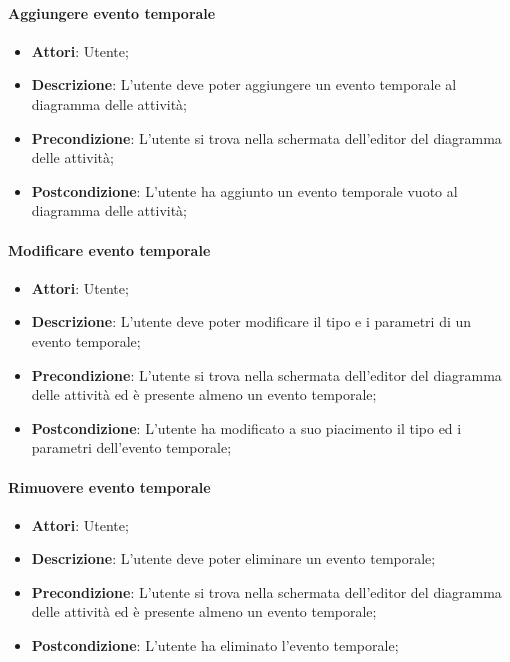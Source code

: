 \paragraph{Aggiungere evento temporale}
\begin{itemize}
	\item \textbf{Attori}: Utente;
	\item \textbf{Descrizione}: L'utente deve poter aggiungere un evento temporale al diagramma delle attività;
	\item \textbf{Precondizione}: L'utente si trova nella schermata dell'editor del diagramma delle attività;
	\item \textbf{Postcondizione}: L'utente ha aggiunto un evento temporale vuoto al diagramma delle attività;
\end{itemize}

\paragraph{Modificare evento temporale}
\begin{itemize}
	\item \textbf{Attori}: Utente;
	\item \textbf{Descrizione}: L'utente deve poter modificare il tipo e i parametri di un evento temporale;
	\item \textbf{Precondizione}: L'utente si trova nella schermata dell'editor del diagramma delle attività ed è presente almeno un evento temporale;
	\item \textbf{Postcondizione}: L'utente ha modificato a suo piacimento il tipo ed i parametri dell'evento temporale;
\end{itemize}

\paragraph{Rimuovere evento temporale}
\begin{itemize}
	\item \textbf{Attori}: Utente;
	\item \textbf{Descrizione}: L'utente deve poter eliminare un evento temporale;
	\item \textbf{Precondizione}: L'utente si trova nella schermata dell'editor del diagramma delle attività ed è presente almeno un evento temporale;
	\item \textbf{Postcondizione}: L'utente ha eliminato l'evento temporale;
\end{itemize}


